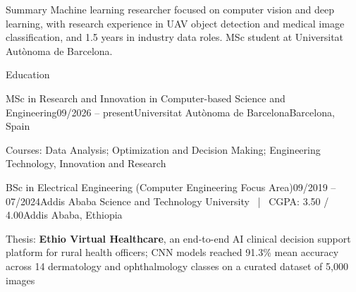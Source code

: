 \documentclass{resume}
\begin{document}
\begin{rSection}{Summary}
Machine learning researcher focused on computer vision and deep learning, with research experience in UAV object detection and medical image classification, and 1.5 years in industry data roles. MSc student at Universitat Aut\`onoma de Barcelona.
\end{rSection}

\begin{rSection}{Education}

\begin{rSubsection}{MSc in Research and Innovation in Computer-based Science and Engineering}{09/2026 -- present}{Universitat Aut\`onoma de Barcelona}{Barcelona, Spain}
\item Courses: Data Analysis; Optimization and Decision Making; Engineering Technology, Innovation and Research
\end{rSubsection}

\begin{rSubsection}{BSc in Electrical Engineering (Computer Engineering Focus Area)}{09/2019 -- 07/2024}{Addis Ababa Science and Technology University \ | \ CGPA: 3.50 / 4.00}{Addis Ababa, Ethiopia}
\item Thesis: \textbf{Ethio Virtual Healthcare}, an end-to-end AI clinical decision support platform for rural health officers; CNN models reached 91.3\% mean accuracy across 14 dermatology and ophthalmology classes on a curated dataset of 5,000 images
\end{rSubsection}

\end{rSection}
\end{document}
